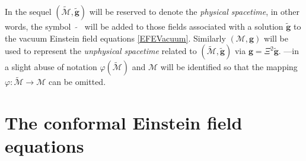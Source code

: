 \documentclass[10pt,a4paper]{article}
\theoremstyle{plain}
\def\bmg{{\bm g}}
\begin{document}
\medskip

In the sequel $(\tilde{\mathcal{M}},\tilde{\bmg})$ will be reserved to
denote the \emph{physical spacetime}, in other words, the symbol
$\tilde{ \quad}$ will be added to those fields associated with a
solution $\tilde{\bmg}$ to the vacuum Einstein field equations
\eqref{EFEVacuum}.  Similarly $(\mathcal{M},\bmg)$ will be used to
represent the \emph{unphysical spacetime} related to
$(\tilde{\mathcal{M}},\tilde{\bmg})$ via $\bmg=\Xi^2\tilde{\bmg}$.
---in a slight abuse of notation $\varphi(\tilde{\mathcal{M}})$ and
$\mathcal{M}$ will be identified so that the mapping $\varphi:
\tilde{\mathcal{M}}\rightarrow\mathcal{M}$ can be omitted.








\section{The  conformal Einstein field equations}
\label{Sec:CFEs}


 




\end{document}
